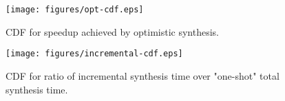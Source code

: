 %
%

\begin{figure}
	\centering
	\texttt{[image: figures/opt-cdf.eps]}
	\caption{CDF for speedup achieved by optimistic synthesis.}
	\label{fig:opt-cdf}
\end{figure}
\begin{figure}
	\centering
	\texttt{[image: figures/incremental-cdf.eps]}
	\caption{CDF for ratio of incremental synthesis time over "one-shot" total synthesis time.}
	\label{fig:incremental-cdf}
\end{figure}




